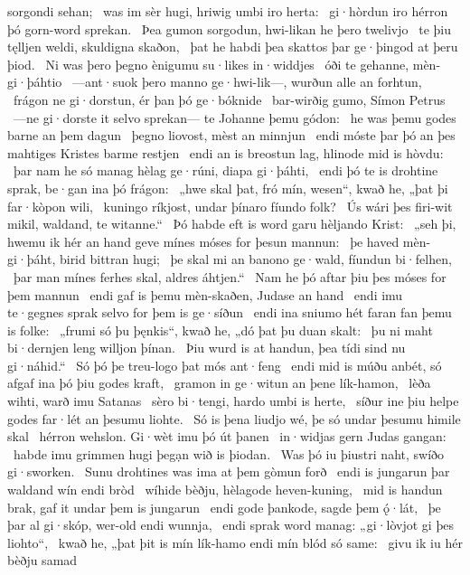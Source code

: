 sorgondi sehan; \hld\ was im sèr hugi,
hriwig umbi iro herta: \hld\ gi·hòrdun iro hérron þó
gorn-word sprekan. \hld\ Þea gumon sorgodun,
hwi-likan he þero twelivjo \hld\ te þiu tęlljen weldi,
skuldigna skaðon, \hld\ þat he habdi þea skattos þar
ge·þingod at þeru þiod. \hld\ Ni was þero þegno ènigumu
su·likes in·widdjes \hld\ óði te gehanne,
mèn-gi·þáhtio \hld\ —ant·suok þero manno ge·hwi-lik—,
wurðun alle an forhtun, \hld\ frágon ne gi·dorstun,
ér þan þó ge·bóknide \hld\ bar-wirðig gumo,
Símon Petrus \hld\ —ne gi·dorste it selvo sprekan—
te Johanne þemu gódon: \hld\ he was þemu godes barne
an þem dagun \hld\ þegno liovost,
mèst an minnjun \hld\ endi móste þar þó an þes mahtiges Kristes
barme restjen \hld\ endi an is breostun lag,
hlinode mid is hòvdu: \hld\ þar nam he só manag hèlag ge·rúni,
diapa gi·þáhti, \hld\ endi þó te is drohtine sprak,
be·gan ina þó frágon: \hld\ „hwe skal þat, fró mín, wesen“, kwað he,
„þat þi far·kòpon wili, \hld\ kuningo ríkjost,
undar þínaro fíundo folk? \hld\ Ús wári þes firi-wit mikil,
waldand, te witanne.“ \hld\ Þó habde eft is word garu
hèljando Krist: \hld\ „seh þi, hwemu ik hér an hand geve
mínes móses for þesun mannun: \hld\ þe haved mèn-gi·þáht,
birid bittran hugi; \hld\ þe skal mi an banono ge·wald,
fíundun bi·felhen, \hld\ þar man mínes ferhes skal,
aldres áhtjen.“ \hld\ Nam he þó aftar þiu
þes móses for þem mannun \hld\ endi gaf is þemu mèn-skaðen,
Judase an hand \hld\ endi imu te·gegnes sprak
selvo for þem is ge·síðun \hld\ endi ina sniumo hét
faran fan þemu is folke: \hld\ „frumi só þu þęnkis“, kwað he,
„dó þat þu duan skalt: \hld\ þu ni maht bi·dernjen leng
willjon þínan. \hld\ Þiu wurd is at handun,
þea tídi sind nu gi·náhid.“ \hld\ Só þó þe treu-logo
þat mós ant·feng \hld\ endi mid is múðu anbét,
só afgaf ina þó þiu godes kraft, \hld\ gramon in ge·witun
an þene lík-hamon, \hld\ lèða wihti,
warð imu Satanas \hld\ sèro bi·tengi,
hardo umbi is herte, \hld\ síður ine þiu helpe godes
far·lét an þesumu liohte. \hld\ Só is þena liudjo wé,
þe só undar þesumu himile skal \hld\ hérron wehslon.
Gi·wèt imu þó út þanen \hld\ in·widjas gern
Judas gangan: \hld\ habde imu grimmen hugi
þegạn wið is þiodan. \hld\ Was þó iu þiustri naht,
swíðo gi·sworken. \hld\ Sunu drohtines
was ima at þem gòmun forð \hld\ endi is jungarun þar
waldand wín endi bròd \hld\ wíhide bèðju,
hèlagode heven-kuning, \hld\ mid is handun brak,
gaf it undar þem is jungarun \hld\ endi gode þankode,
sagde þem ǫ́·lát, \hld\ þe þar al gi·skóp,
wer-old endi wunnja, \hld\ endi sprak word manag:
„gi·lòvjot gi þes liohto“, \hld\ kwað he, „þat þit is mín lík-hamo
endi mín blód só same: \hld\ givu ik iu hér bèðju samad
